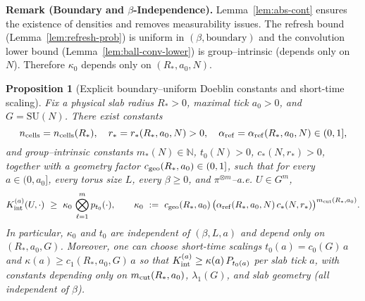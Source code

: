 \documentclass[11pt]{amsart}
\theoremstyle{plain}
\newtheorem{proposition}[theorem]{Proposition}
\theoremstyle{definition}
\theoremstyle{remark}
\begin{document}
\begin{mdframed}[linewidth=0.5pt, linecolor=yellow!40, backgroundcolor=yellow!3, roundcorner=2pt, innertopmargin=8pt, innerbottommargin=8pt, skipabove=10pt, skipbelow=10pt]
\noindent\textbf{Remark (Boundary and $\beta$-Independence).} Lemma~\ref{lem:abs-cont} ensures the existence of densities and removes measurability issues. The refresh bound (Lemma~\ref{lem:refresh-prob}) is uniform in $(\beta,\text{boundary})$ and the convolution lower bound (Lemma~\ref{lem:ball-conv-lower}) is group–intrinsic (depends only on $N$). Therefore $\kappa_0$ depends only on $(R_*,a_0,N)$.
\end{mdframed}

\begin{proposition}[Explicit boundary–uniform Doeblin constants and short-time scaling]\label{prop:explicit-doeblin-constants}
Fix a physical slab radius $R_*>0$, maximal tick $a_0>0$, and $G=\mathrm{SU}(N)$. There exist constants
\[
  n_{\rm cells}=n_{\rm cells}(R_*),\quad r_*=r_*(R_*,a_0,N)>0,\quad \alpha_{\rm ref}=\alpha_{\rm ref}(R_*,a_0,N)\in(0,1],
\]
and group–intrinsic constants $m_*(N)\in\mathbb N$, $t_0(N)>0$, $c_*(N,r_*)>0$, together with a geometry factor $c_{\rm geo}(R_*,a_0)\in(0,1]$, such that for every $a\in(0,a_0]$, every torus size $L$, every $\beta\ge 0$, and $\pi^{\otimes m}$–a.e. $U\in G^m$,
\begin{equation}\label{eq:doeblin-kappa0}
  K_{\rm int}^{(a)}(U,\cdot)\ \ge\ \kappa_0\,\bigotimes_{\ell=1}^m p_{t_0}(\cdot),\qquad
  \kappa_0\ :=\ c_{\rm geo}(R_*,a_0)\,\big(\alpha_{\rm ref}(R_*,a_0,N)\,c_*(N,r_*)\big)^{m_{\rm cut}(R_*,a_0)}.
\end{equation}
In particular, $\kappa_0$ and $t_0$ are independent of $(\beta,L,a)$ and depend only on $(R_*,a_0,G)$. Moreover, one can choose short-time scalings $t_0(a)=c_0(G)\,a$ and $\kappa(a)\ge c_1(R_*,a_0,G)\,a$ so that $K_{\rm int}^{(a)}\ge \kappa(a)\,P_{t_0(a)}$ per slab tick $a$, with constants depending only on $m_{\rm cut}(R_*,a_0)$, $\lambda_1(G)$, and slab geometry (all independent of $\beta$).


\end{proposition}
\end{document}
